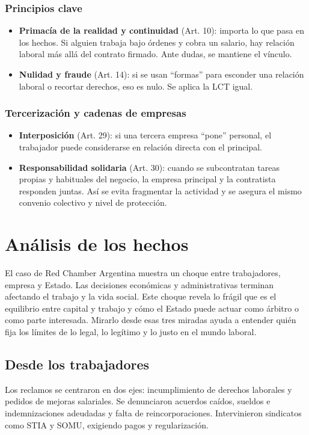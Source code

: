 \documentclass[]{informeutn}
\begin{document}
    \subsection*{Principios clave}
     \begin{itemize}
      \item \textbf{Primacía de la realidad y continuidad} (Art. 10): importa lo que pasa en los hechos. Si alguien 
        trabaja bajo órdenes y cobra un salario, hay relación laboral más allá del contrato firmado. Ante dudas, se
        mantiene el vínculo.
      \item \textbf{Nulidad y fraude} (Art. 14): si se usan “formas” para esconder una relación laboral o recortar
        derechos, eso es nulo. Se aplica la LCT igual.
     \end{itemize}
    
    \subsection*{Tercerización y cadenas de empresas}
     \begin{itemize}
      \item \textbf{Interposición} (Art. 29): si una tercera empresa “pone” personal, el trabajador puede considerarse 
        en relación directa con el principal.
      \item \textbf{Responsabilidad solidaria} (Art. 30): cuando se subcontratan tareas propias y habituales del 
        negocio, la empresa principal y la contratista responden juntas. Así se evita fragmentar la actividad y se 
        asegura el mismo convenio colectivo y nivel de protección.
     \end{itemize}

  \chapter{Análisis de los hechos}
    El caso de Red Chamber Argentina muestra un choque entre trabajadores, empresa y Estado. Las decisiones económicas y
    administrativas terminan afectando el trabajo y la vida social. Este choque revela lo frágil que es el equilibrio entre 
    capital y trabajo y cómo el Estado puede actuar como árbitro o como parte interesada. Mirarlo desde esas tres miradas 
    ayuda a entender quién fija los límites de lo legal, lo legítimo y lo justo en el mundo laboral.

\section{Desde los trabajadores}
Los reclamos se centraron en dos ejes: incumplimiento de derechos laborales y pedidos de mejoras salariales.
Se denunciaron acuerdos caídos, sueldos e indemnizaciones adeudadas y falta de reincorporaciones. Intervinieron
sindicatos como STIA y SOMU, exigiendo pagos y regularización.
\end{document}
